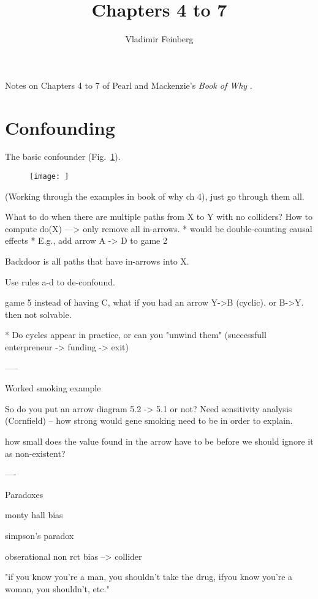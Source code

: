\documentclass{article}
\title{Chapters 4 to 7}
\author{Vladimir Feinberg}
\begin{document}
\maketitle

Notes on Chapters 4 to 7 of Pearl and Mackenzie's \textit{Book of Why} \cite{pearl2018book}.

\setcounter{section}{3}

\section{Confounding}

The basic confounder (Fig.~\ref{fig:fig41}).

\begin{figure}[h]
  \centering
  \texttt{[image: ]} %
  \caption{\label{fig:fig41} }
\end{figure}


(Working through the examples in book of why ch 4), just go through them all.

What to do when there are multiple paths from X to Y with no colliders? How to compute do(X) ---> only remove all in-arrows.
* would be double-counting causal effects
* E.g., add arrow A -> D to game 2

Backdoor is all paths that have in-arrows into X.

Use rules a-d to de-confound.

game 5 instead of having C, what if you had an arrow Y->B (cyclic). or B->Y. then not solvable.

* Do cycles appear in practice, or can you "unwind them" (successfull enterpreneur -> funding -> exit)

-----

Worked smoking example

So do you put an arrow diagram 5.2 -> 5.1 or not? Need sensitivity analysis (Cornfield) -- how strong would gene smoking need to be in order to explain.

how small does the value found in the arrow have to be before we should ignore it as non-existent?

----

Paradoxes

monty hall bias

simpson's paradox

obserational non rct bias --> collider

"if you know you're a man, you shouldn't take the drug, ifyou know you're a woman, you shouldn't, etc."
\end{document}
